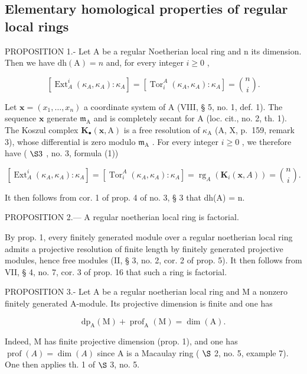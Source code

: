 \subsection{Elementary homological properties of regular local rings}

PROPOSITION 1.- Let A be a regular Noetherian local ring and n its dimension. Then we have \(\mathrm{dh(A)} = n\) and, for every integer \(i \geqslant 0\) ,

\[
\left[ \operatorname{Ext} _ {A} ^ {i} \left(\kappa_ {A}, \kappa_ {A}\right): \kappa_ {A} \right] = \left[ \operatorname{Tor} _ {i} ^ {A} \left(\kappa_ {A}, \kappa_ {A}\right): \kappa_ {A} \right] = \binom {n} {i}.
\]

Let \(\mathbf{x} = (x_{1},\ldots ,x_{n})\) a coordinate system of A (VIII, § 5, no. 1, def. 1). The sequence \(\mathbf{x}\) generate \(\mathfrak{m}_{\mathrm{A}}\) and is completely secant for A (loc. cit., no. 2, th. 1). The Koszul complex \(\mathbf{K}_{\bullet}(\mathbf{x},\mathrm{A})\) is a free resolution of \(\kappa_{\mathrm{A}}\) (A, X, p.~159, remark 3), whose differential is zero modulo \(\mathfrak{m}_{\mathrm{A}}\) . For every integer \(i\geqslant 0\) , we therefore have ( \(\S 3\) , no. 3, formula (1))

\[
\left[ \operatorname{Ext} _ {A} ^ {i} (\kappa_ {A}, \kappa_ {A}): \kappa_ {A} \right] = \left[ \operatorname{Tor} _ {i} ^ {A} (\kappa_ {A}, \kappa_ {A}): \kappa_ {A} \right] = \operatorname{rg} _ {A} (\mathbf {K} _ {i} (\mathbf {x}, A)) = \binom {n} {i}.
\]

It then follows from cor. 1 of prop. 4 of no. 3, § 3 that dh(A) = n.

PROPOSITION 2.--- A regular noetherian local ring is factorial.

By prop. 1, every finitely generated module over a regular noetherian local ring admits a projective resolution of finite length by finitely generated projective modules, hence free modules (II, § 3, no. 2, cor. 2 of prop. 5). It then follows from VII, § 4, no. 7, cor. 3 of prop. 16 that such a ring is factorial.

PROPOSITION 3.- Let A be a regular noetherian local ring and M a nonzero finitely generated A-module. Its projective dimension is finite and one has

\[
\mathrm{dp} _ {\mathrm{A}} (\mathrm{M}) + \operatorname{prof} _ {\mathrm{A}} (\mathrm{M}) = \dim (\mathrm{A}).
\]

Indeed, M has finite projective dimension (prop. 1), and one has \(\operatorname{prof}(A) = \dim(A)\) since A is a Macaulay ring ( \(\S\) 2, no. 5, example 7). One then applies th. 1 of \(\S\) 3, no. 5.

